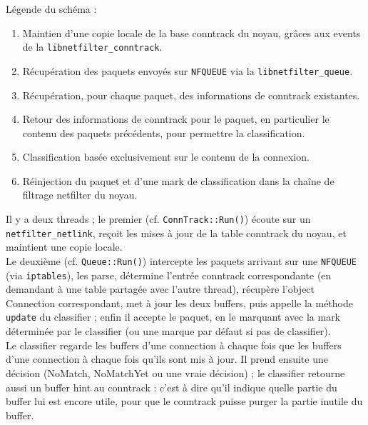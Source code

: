 \begin{footnotesize}
\noindent Légende du schéma :

\begin{enumerate}
\item Maintien d'une copie locale de la base conntrack du noyau, grâces aux \og events \fg{} de la \verb+libnetfilter_conntrack+.
\item Récupération des paquets envoyés sur \verb+NFQUEUE+ via la \verb+libnetfilter_queue+.
\item Récupération, pour chaque paquet, des informations de conntrack existantes.
\item Retour des informations de conntrack pour le paquet, en particulier le contenu des paquets précédents, pour permettre la classification.
\item Classification basée exclusivement sur le contenu de la connexion.
\item Réinjection du paquet et d'une \og mark \fg{} de classification dans la chaîne de filtrage netfilter du noyau.
\end{enumerate}
\end{footnotesize}


Il y a deux threads ; le premier (cf. \verb+ConnTrack::Run()+) écoute sur un
\verb+netfilter_netlink+, reçoit les mises à jour de la table conntrack du noyau, et
maintient une copie locale.\\

Le deuxième (cf. \verb+Queue::Run()+) intercepte les paquets arrivant sur une
\verb+NFQUEUE+ (via \verb+iptables+), les parse, détermine l'entrée conntrack
correspondante (en demandant à une table partagée avec l'autre
thread), récupère l'object \og Connection \fg{} correspondant, met à jour les
deux buffers, puis appelle la méthode \verb+update+ du classifier ; enfin il
accepte le paquet, en le marquant avec la mark déterminée par le
classifier (ou une marque par défaut si pas de classifier).\\

Le classifier regarde les buffers d'une connection à chaque fois que les buffers d'une connection à chaque fois qu'ils sont mis à jour. Il prend ensuite une décision (NoMatch, NoMatchYet ou une vraie décision) ; le classifier retourne aussi un \og buffer hint \fg{} au conntrack : c'est à dire qu'il indique quelle
partie du buffer lui est encore utile, pour que le conntrack puisse
purger la partie inutile du buffer.\\



